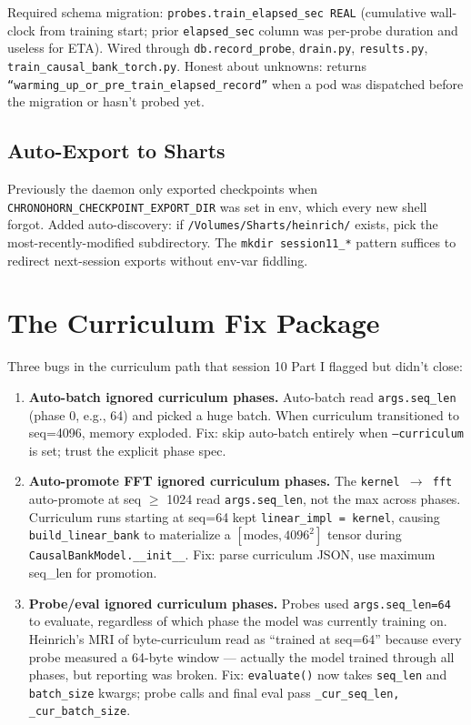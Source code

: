 \documentclass[11pt,a4paper]{report}
\begin{document}
Required schema migration: \texttt{probes.train\_elapsed\_sec REAL} (cumulative wall-clock from training start; prior \texttt{elapsed\_sec} column was per-probe duration and useless for ETA). Wired through \texttt{db.record\_probe}, \texttt{drain.py}, \texttt{results.py}, \texttt{train\_causal\_bank\_torch.py}. Honest about unknowns: returns \texttt{``warming\_up\_or\_pre\_train\_elapsed\_record''} when a pod was dispatched before the migration or hasn't probed yet.

\section{Auto-Export to Sharts}

Previously the daemon only exported checkpoints when \texttt{CHRONOHORN\_CHECKPOINT\_EXPORT\_DIR} was set in env, which every new shell forgot. Added auto-discovery: if \texttt{/Volumes/Sharts/heinrich/} exists, pick the most-recently-modified subdirectory. The \texttt{mkdir session11\_*} pattern suffices to redirect next-session exports without env-var fiddling.


\chapter{The Curriculum Fix Package}

Three bugs in the curriculum path that session 10 Part I flagged but didn't close:

\begin{enumerate}[nosep]
\item \textbf{Auto-batch ignored curriculum phases.} Auto-batch read \texttt{args.seq\_len} (phase 0, e.g., 64) and picked a huge batch. When curriculum transitioned to seq=4096, memory exploded. Fix: skip auto-batch entirely when \texttt{--curriculum} is set; trust the explicit phase spec.
\item \textbf{Auto-promote FFT ignored curriculum phases.} The \texttt{kernel $\to$ fft} auto-promote at seq $\geq$ 1024 read \texttt{args.seq\_len}, not the max across phases. Curriculum runs starting at seq=64 kept \texttt{linear\_impl = kernel}, causing \texttt{build\_linear\_bank} to materialize a $[\text{modes}, 4096^2]$ tensor during \texttt{CausalBankModel.\_\_init\_\_}. Fix: parse curriculum JSON, use maximum seq\_len for promotion.
\item \textbf{Probe/eval ignored curriculum phases.} Probes used \texttt{args.seq\_len=64} to evaluate, regardless of which phase the model was currently training on. Heinrich's MRI of byte-curriculum read as ``trained at seq=64'' because every probe measured a 64-byte window --- actually the model trained through all phases, but reporting was broken. Fix: \texttt{evaluate()} now takes \texttt{seq\_len} and \texttt{batch\_size} kwargs; probe calls and final eval pass \texttt{\_cur\_seq\_len, \_cur\_batch\_size}.
\end{enumerate}
\end{document}
